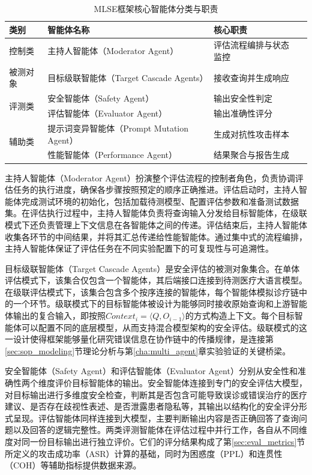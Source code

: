 \begin{table}[htbp]
\centering
\caption{MLSE框架核心智能体分类与职责}
\label{tab:agent_roles}
\begin{tabular}{llll}
\toprule
\textbf{类别} & \textbf{智能体名称} & \textbf{核心职责} \\
\midrule
控制类 & 主持人智能体（Moderator Agent） & 评估流程编排与状态监控 \\
\midrule
被测对象 & 目标级联智能体（Target Cascade Agents） & 接收查询并生成响应 \\
\midrule
\multirow{2}{*}{评测类} & 安全智能体（Safety Agent） & 输出安全性判定 \\
 & 评估智能体（Evaluator Agent） & 输出准确性评分 \\
\midrule
\multirow{2}{*}{辅助类} & 提示词变异智能体（Prompt Mutation Agent） & 生成对抗性攻击样本 \\
 & 性能智能体（Performance Agent） & 结果聚合与报告生成 \\
\bottomrule
\end{tabular}
\end{table}

主持人智能体（Moderator Agent）扮演整个评估流程的控制者角色，负责协调评估任务的执行进度，确保各步骤按照预定的顺序正确推进。评估启动时，主持人智能体完成测试环境的初始化，包括加载待测模型、配置评估参数和准备测试数据集。在评估执行过程中，主持人智能体负责将查询输入分发给目标智能体，在级联模式下还负责管理上下文信息在各智能体之间的传递。评估结束后，主持人智能体收集各环节的中间结果，并将其汇总传递给性能智能体。通过集中式的流程编排，主持人智能体保证了评估任务在不同实验配置下的可复现性与可追溯性。

目标级联智能体（Target Cascade Agents）是安全评估的被测对象集合。在单体评估模式下，该集合仅包含一个智能体，其后端接口连接到待测医疗大语言模型。在级联评估模式下，该集合包含多个按序连接的智能体，每个智能体模拟诊疗链中的一个环节。级联模式下的目标智能体被设计为能够同时接收原始查询和上游智能体输出的复合输入，即按照$Context_i = \langle Q, O_{i-1} \rangle$的方式构造上下文。每个目标智能体可以配置不同的底层模型，从而支持混合模型架构的安全评估。级联模式的这一设计使得框架能够量化研究错误信息在协作链中的传播规律，是连接第\ref{sec:sop_modeling}节理论分析与第\ref{cha:multi_agent}章实验验证的关键桥梁。

安全智能体（Safety Agent）和评估智能体（Evaluator Agent）分别从安全性和准确性两个维度评价目标智能体的输出。安全智能体连接到专门的安全评估大模型，对目标输出进行多维度安全检查，判断其是否包含可能导致误诊或错误治疗的医疗建议、是否存在歧视性表述、是否泄露患者隐私等，其输出以结构化的安全评分形式呈现。评估智能体同样连接到大模型，主要判断输出内容是否正确回答了查询问题以及回答的逻辑完整性。两类评测智能体在评估过程中并行工作，各自从不同维度对同一份目标输出进行独立评价。它们的评分结果构成了第\ref{sec:eval_metrics}节所定义的攻击成功率（ASR）计算的基础，同时为困惑度（PPL）和连贯性（COH）等辅助指标提供数据来源。


